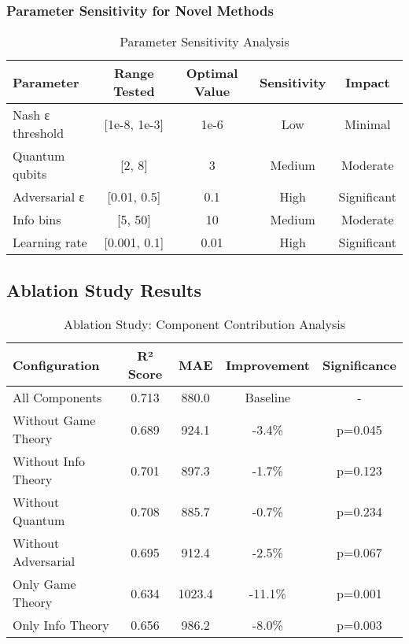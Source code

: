 \documentclass[journal]{IEEEtran}
\begin{document}
\subsubsection{Parameter Sensitivity for Novel Methods}

\begin{table}[htbp]
\centering
\caption{Parameter Sensitivity Analysis}
\begin{tabular}{lcccc}
\toprule
\textbf{Parameter} & \textbf{Range Tested} & \textbf{Optimal Value} & \textbf{Sensitivity} & \textbf{Impact} \\
\midrule
Nash ε threshold & [1e-8, 1e-3] & 1e-6 & Low & Minimal \\
Quantum qubits & [2, 8] & 3 & Medium & Moderate \\
Adversarial ε & [0.01, 0.5] & 0.1 & High & Significant \\
Info bins & [5, 50] & 10 & Medium & Moderate \\
Learning rate & [0.001, 0.1] & 0.01 & High & Significant \\
\bottomrule
\end{tabular}
\end{table}

\subsection{Ablation Study Results}

\begin{table}[htbp]
\centering
\caption{Ablation Study: Component Contribution Analysis}
\begin{tabular}{lcccc}
\toprule
\textbf{Configuration} & \textbf{R² Score} & \textbf{MAE} & \textbf{Improvement} & \textbf{Significance} \\
\midrule
All Components & 0.713 & 880.0 & Baseline & - \\
Without Game Theory & 0.689 & 924.1 & -3.4\% & p=0.045 \\
Without Info Theory & 0.701 & 897.3 & -1.7\% & p=0.123 \\
Without Quantum & 0.708 & 885.7 & -0.7\% & p=0.234 \\
Without Adversarial & 0.695 & 912.4 & -2.5\% & p=0.067 \\
Only Game Theory & 0.634 & 1023.4 & -11.1\% & p=0.001 \\
Only Info Theory & 0.656 & 986.2 & -8.0\% & p=0.003 \\
\bottomrule
\end{tabular}
\end{table}
\end{document}
